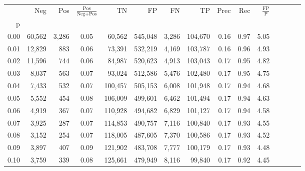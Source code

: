 \begin{tabular}{rrrcrrrrrrrrrrr}
\toprule
{} &     Neg &     Pos & $\frac{\text{Pos}}{\text{Neg}+\text{Pos}}$ &       TN &       FP &       FN &       TP &  Prec &   Rec & $\frac{\text{FP}}{\text{P}}$ \\
p    &         &         &                                            &          &          &          &          &       &       &                              \\
\midrule
0.00 &  60,562 &   3,286 &                                       0.05 &   60,562 &  545,048 &    3,286 &  104,670 &  0.16 &  0.97 &                         5.05 \\
0.01 &  12,829 &     883 &                                       0.06 &   73,391 &  532,219 &    4,169 &  103,787 &  0.16 &  0.96 &                         4.93 \\
0.02 &  11,596 &     744 &                                       0.06 &   84,987 &  520,623 &    4,913 &  103,043 &  0.17 &  0.95 &                         4.82 \\
0.03 &   8,037 &     563 &                                       0.07 &   93,024 &  512,586 &    5,476 &  102,480 &  0.17 &  0.95 &                         4.75 \\
0.04 &   7,433 &     532 &                                       0.07 &  100,457 &  505,153 &    6,008 &  101,948 &  0.17 &  0.94 &                         4.68 \\
0.05 &   5,552 &     454 &                                       0.08 &  106,009 &  499,601 &    6,462 &  101,494 &  0.17 &  0.94 &                         4.63 \\
0.06 &   4,919 &     367 &                                       0.07 &  110,928 &  494,682 &    6,829 &  101,127 &  0.17 &  0.94 &                         4.58 \\
0.07 &   3,925 &     287 &                                       0.07 &  114,853 &  490,757 &    7,116 &  100,840 &  0.17 &  0.93 &                         4.55 \\
0.08 &   3,152 &     254 &                                       0.07 &  118,005 &  487,605 &    7,370 &  100,586 &  0.17 &  0.93 &                         4.52 \\
0.09 &   3,897 &     407 &                                       0.09 &  121,902 &  483,708 &    7,777 &  100,179 &  0.17 &  0.93 &                         4.48 \\
0.10 &   3,759 &     339 &                                       0.08 &  125,661 &  479,949 &    8,116 &   99,840 &  0.17 &  0.92 &                         4.45 \\

\end{tabular}
